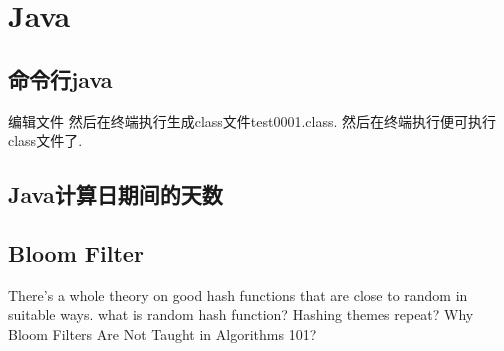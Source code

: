 \chapter{Java}
\section{命令行java}
编辑文件
然后在终端执行生成class文件test0001.class.
然后在终端执行便可执行class文件了.

\newpage
\section{Java计算日期间的天数}

\newpage
\section{Bloom Filter}
There's a whole theory on good hash functions that are close to random in
suitable ways.
what is random hash function?
Hashing themes repeat?
Why Bloom Filters Are Not Taught in Algorithms 101?

